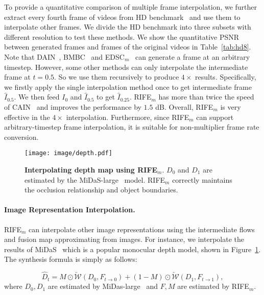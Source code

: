 \documentclass[final]{cvpr}
\newcommand{\backwardwarp}{\overleftarrow{\mathcal{W}}}
\begin{document}
To provide a quantitative comparison of multiple frame interpolation, we further extract every fourth frame of videos from HD benchmark~\cite{bao2019memc} and use them to interpolate other frames. We divide the HD benchmark into three subsets with different resolution to test these methods. We show the quantitative PSNR between generated frames and frames of the original videos in Table~\ref{tab:hd8}. Note that DAIN~\cite{bao2019depth}, BMBC~\cite{park2020bmbc} and EDSC$_m$~\cite{cheng2020video} can generate a frame at an arbitrary timestep. However, some other methods can only interpolate the intermediate frame at $t=0.5$. So we use them recursively to produce $4\times$ results. Specifically, we firstly apply the single interpolation method once to get intermediate frame $\widehat I_{0.5}$. We then feed $I_0$ and $\widehat I_{0.5}$ to get $\widehat I_{0.25}$. RIFE$_m$ has more than twice the speed of CAIN~\cite{choi2020channel} and improves the performance by $1.5$ dB. Overall, RIFE$_m$ is very effective in the $4\times$ interpolation. Furthermore, since RIFE$_m$ can support arbitrary-timestep frame interpolation, it is suitable for non-multiplier frame rate conversion.

\begin{figure}[t]
	\centering
	\texttt{[image: image/depth.pdf]}
	\caption{\textbf{Interpolating depth map using RIFE$_m$}. $D_0$ and $D_1$ are estimated by the MiDaS-large~\cite{Ranftl2020} model. RIFE$_m$ correctly maintains the occlusion relationship and object boundaries.} \label{fig:depth}
\end{figure}

\paragraph{Image Representation Interpolation.} RIFE$_m$ can interpolate other image representations using the intermediate flows and fusion map approximating from images. For instance, we interpolate the results of MiDaS~\cite{Ranftl2020} which is a popular monocular depth model, shown in Figure~\ref{fig:depth}. The synthesis formula is simply as follows:

\begin{equation}
\widehat{D}_t = M \odot \backwardwarp(D_0, F_{t\rightarrow 0}) + (1 - M) \odot \backwardwarp(D_1, F_{t\rightarrow 1}),
\end{equation}
where $D_0, D_1$ are estimated by MiDas-large~\cite{Ranftl2020} and $F, M$ are estimated by RIFE$_m$.
\end{document}
